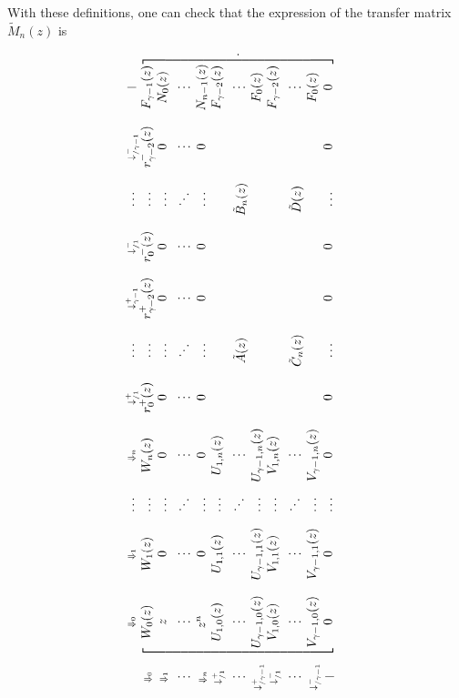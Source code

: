 \documentclass{article}
\begin{document}
With these definitions, one can check that the expression of the transfer
matrix $\tilde{M}_n(z)$ is

\pagebreak

\begin{equation*}
\rotatebox{90}{$
\begin{blockarray}{cccccccccccc}
   & \scriptstyle{\Downarrow_0} & \scriptstyle{\Downarrow_1} &
   \ldots & \scriptstyle{\Downarrow_n} &
    \scriptstyle{\downarrow_{/1}^+} & 
    \ldots & \scriptstyle{\downarrow_{\gamma-1}^+} &
    \scriptstyle{\downarrow_{/1}^-} & \ldots &
    \scriptstyle{\downarrow_{/\gamma-1}^-} & \scriptstyle{|} \\
\begin{block}{c[ccccccccccc]}
\scriptstyle{\Downarrow_0} & W_0(z) & W_1(z) & \ldots & W_n(z) &
    r_0^+(z) & \ldots & r_{\gamma-2}^+(z) & r_0^-(z) & \ldots &
    r_{\gamma-2}^-(z) & F_{\gamma-1}(z) \\
\scriptstyle{\Downarrow_1} & z  & 0 & \ldots &
  0 & 0 & \ldots & 0 & 0 & \ldots & 0 & N_0(z) \\
\vdots & \vdots & \vdots & \ddots & \vdots & \vdots & \ddots &
  \vdots & \vdots & \ddots & \vdots & \vdots \\
\scriptstyle{\Downarrow_n} & z^n & 0 & \ldots &
  0 & 0 & \ldots & 0 & 0 & \ldots & 0 & N_{n-1}(z) \\
\scriptstyle{\downarrow_{/1}^+} & U_{1,0}(z) & U_{1,1}(z) & \ldots &
  U_{1,n}(z) & & & & & & & F_{\gamma-2}(z) \\
\vdots & \vdots & \vdots & \ddots & \vdots & & \tilde{A}(z) & & &
  \tilde{B}_n(z) & & \vdots \\
\scriptstyle{\downarrow_{/\gamma-1}^+} & U_{\gamma-1,0}(z) &
  U_{\gamma-1,1}(z) & \ldots & U_{\gamma-1,n}(z) & & & & & & & F_0(z) \\
\scriptstyle{\downarrow_{/1}^-} & V_{1,0}(z) & V_{1,1}(z) & \ldots &
    V_{1,n}(z) & & & & & & & F_{\gamma-2}(z) \\
\vdots & \vdots & \vdots & \ddots & \vdots & & \tilde{C}_n(z) &
  & & \tilde{D}(z) & & \vdots \\
\scriptstyle{\downarrow_{/\gamma-1}^-} & V_{\gamma-1,0}(z) &
    V_{\gamma-1,1}(z) & \ldots & V_{\gamma-1,n}(z) & & &
    & & & & F_0(z) \\
\scriptstyle{|} & 0 & 0 & \ldots & 0 & 0 & \ldots & 0 & 0 &
  \ldots & 0 & 0 \\
\end{block}
\end{blockarray}.
$}
\end{equation*}
\end{document}
